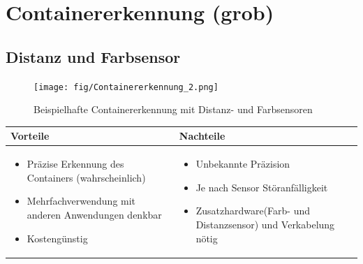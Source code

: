 
\section{Containererkennung (grob)}


\subsection{Distanz und Farbsensor}

\begin{figure} [hbp]
	\centering
	\texttt{[image: fig/Containererkennung\_2.png]}
	\caption{Beispielhafte Containererkennung mit Distanz- und Farbsensoren}
\end{figure}

\begin{table}[h]
\begin{tabular}{p{} | p{}}


 \textbf{Vorteile} & \textbf{Nachteile} \\ \hline
	 
\begin{itemize}
\item Präzise Erkennung des Containers (wahrscheinlich)
\item Mehrfachverwendung mit anderen Anwendungen denkbar
\item Kostengünstig
\end{itemize}

 
 &
 
\begin{itemize}
\item Unbekannte Präzision
\item Je nach Sensor Störanfälligkeit
\item Zusatzhardware(Farb- und Distanzsensor) und Verkabelung nötig
\end{itemize}

\end{tabular}
\end{table}

